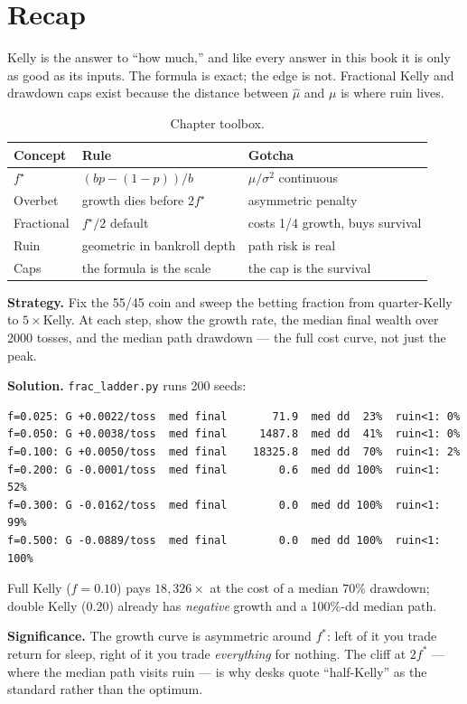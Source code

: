 \section{Recap}\label{sec:krecap}

Kelly is the answer to ``how much,'' and like every answer in this book it is only as
good as its inputs. The formula is exact; the edge is not. Fractional Kelly and drawdown
caps exist because the distance between $\hat\mu$ and $\mu$ is where ruin lives.

\begin{table}[htbp]\centering\small
\caption{Chapter toolbox.}
\begin{tabular}{@{}lll@{}}
\toprule
Concept & Rule & Gotcha\\
\midrule
$f^\star$ & $(bp-(1-p))/b$ & $\mu/\sigma^2$ continuous\\
Overbet & growth dies before $2f^\star$ & asymmetric penalty\\
Fractional & $f^\star/2$ default & costs 1/4 growth, buys survival\\
Ruin & geometric in bankroll depth & path risk is real\\
Caps & the formula is the scale & the cap is the survival\\
\bottomrule
\end{tabular}
\end{table}

\begin{example}\label{ex:fracladder}
\textbf{Strategy.} Fix the 55/45 coin and sweep the betting
fraction from quarter-Kelly to $5\times$Kelly. At each step, show
the growth rate, the median final wealth over 2000 tosses, and the
median path drawdown --- the full cost curve, not just the peak.

\textbf{Solution.} \texttt{frac\_ladder.py} runs 200 seeds:
\begin{verbatim}
f=0.025: G +0.0022/toss  med final       71.9  med dd  23%  ruin<1: 0%
f=0.050: G +0.0038/toss  med final     1487.8  med dd  41%  ruin<1: 0%
f=0.100: G +0.0050/toss  med final    18325.8  med dd  70%  ruin<1: 2%
f=0.200: G -0.0001/toss  med final        0.6  med dd 100%  ruin<1: 52%
f=0.300: G -0.0162/toss  med final        0.0  med dd 100%  ruin<1: 99%
f=0.500: G -0.0889/toss  med final        0.0  med dd 100%  ruin<1: 100%
\end{verbatim}
Full Kelly ($f=0.10$) pays $18{,}326\times$ at the cost of a
median $70\%$ drawdown; double Kelly ($0.20$) already has
\emph{negative} growth and a 100\%-dd median path.

\textbf{Significance.} The growth curve is asymmetric around
$f^*$: left of it you trade return for sleep, right of it you
trade \emph{everything} for nothing. The cliff at $2f^*$ ---
where the median path visits ruin --- is why desks quote
``half-Kelly'' as the standard rather than the optimum.
\end{example}


